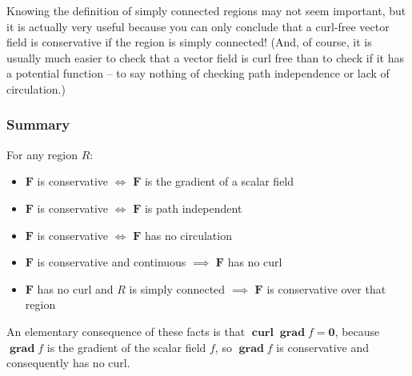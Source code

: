 \documentclass{myarticle}
\DeclareMathOperator{\grad}{\mathbf{grad}}
\DeclareMathOperator{\curl}{\mathbf{curl}}
\renewcommand{\vec}[1]{\mathbf{#1}}
\theoremstyle{nospace}
\newtheorem{old series theorem}{Theorem}
\newenvironment{series theorem}{\begin{mdframed}\begin{old series theorem}}{\end{old series theorem}\end{mdframed}}
\begin{document}
Knowing the definition of simply connected regions may not seem important, but it is actually very useful because you can only conclude that a curl-free vector field is conservative if the region is simply connected! (And, of course, it is usually much easier to check that a vector field is curl free than to check if it has a potential function -- to say nothing of checking path independence or lack of circulation.)

\subsubsection{Summary} \label{sec:conservative vector fields summary}

For any region $R$:
\begin{itemize}
\item $\vec{F}$ is conservative $\iff$ $\vec{F}$ is the gradient of a scalar field
\item $\vec{F}$ is conservative $\iff$ $\vec{F}$ is path independent
\item $\vec{F}$ is conservative $\iff$ $\vec{F}$ has no circulation
\item $\vec{F}$ is conservative and continuous $\implies$ $\vec{F}$ has no curl
\item $\vec{F}$ has no curl and $R$ is simply connected $\implies$ $\vec{F}$ is conservative over that region
\end{itemize}

An elementary consequence of these facts is that $\curl \grad f = \vec{0}$, because $\grad f$ is the gradient of the scalar field $f$, so $\grad f$ is conservative and consequently has no curl.
\end{document}
